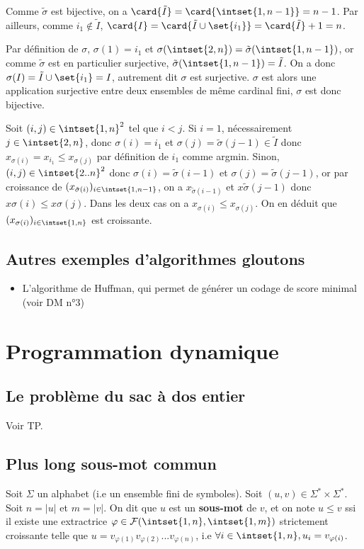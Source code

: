 \documentclass{scrartcl}
\begin{document}
			\begin{demo}
				\item Comme $\tilde{\sigma}$ est bijective, on a $\card{\tilde{I}} = \card{\intset{1,n-1}} = n-1$. Par ailleurs, comme $i_1 \not\in \tilde I$,
				$\card{I}= \card{\tilde{I} \cup \set{i_1}} = \card{\tilde{I}} + 1 = n$.

				\item Par définition de $\sigma$, $\sigma(1) = i_1$ et $\sigma(\intset{2,n}) = \tilde{\sigma}(\intset{1,n-1})$, or comme $\tilde{\sigma}$ est en particulier
				surjective, $\tilde{\sigma}(\intset{1,n-1}) = \tilde{I}$. On a donc $\sigma(I) = \tilde{I} \cup \set{i_1} = I$, autrement dit $\sigma$ est surjective.
				$\sigma$ est alors une application surjective entre deux ensembles de même cardinal fini, $\sigma$ est donc bijective.

				\item Soit $(i, j) \in \intset{1,n}^2$ tel que $i < j$.
				Si $i = 1$, nécessairement $j \in \intset{2,n}$, 
				donc $\sigma(i) = i_1$ et $\sigma(j) = \tilde{\sigma}(j-1) \in \tilde{I}$ donc $x_{\sigma(i)} = x_{i_1} \leq x_{\sigma(j)}$ 
				par définition de $i_1$ comme argmin.
				Sinon, $(i, j) \in \intset{2..n}^2$ donc $\sigma(i) = \tilde{\sigma}(i-1)$ et $\sigma(j) = \tilde{\sigma}(j -1)$, 
				or par croissance de $(x_{\tilde{\sigma}(i)})_{i\in\intset{1,n-1}}$, on a
				$x_{\tilde{\sigma}(i-1)}$ et $x\tilde{\sigma}(j-1)$ donc $x\sigma(i) \leq x\sigma(j)$.
				Dans les deux cas on a $x_{\sigma(i)} \leq x_{\sigma(j)}$. On en déduit que $(x_{\sigma(i)})_{i\in\intset{1,n}}$ est croissante. 
			\end{demo}
		\subsection{Autres exemples d'algorithmes gloutons}
			\begin{itemize}
				\item L'algorithme de Huffman, qui permet de générer un codage de score minimal (voir DM n°3)
			\end{itemize}
	\section{Programmation dynamique}
		\subsection{Le problème du sac à dos entier}
			Voir TP.
		\subsection{Plus long sous-mot commun}
			Soit $\Sigma$ un alphabet (i.e un ensemble fini de symboles).
			Soit $(u,v) \in \Sigma^*\times\Sigma^*$. Soit $n = |u|$ et $m =|v|$.
			On dit que $u$ est un \textbf{sous-mot} de $v$, et on note $u \leq v$ ssi il existe une extractrice
			$\varphi \in \mathcal{F}(\intset{1,n},\intset{1,m})$ strictement croissante telle que 
			$u = v_{\varphi(1)}v_{\varphi(2)}...v_{\varphi(n)}$, i.e $\forall i \in \intset{1,n}, u_i = v_{\varphi(i)}$.
\end{document}
